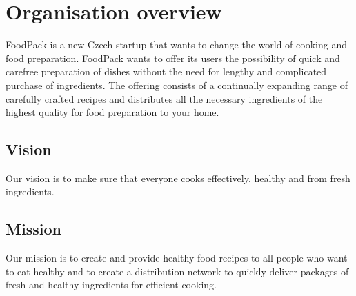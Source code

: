 \documentclass[11pt,a4paper]{article}
\begin{document}
\setlength{\parskip}{0pt}
    \hypersetup{hidelinks}\tableofcontents
\setlength{\parskip}{0pt}

\newpage


\section{Organisation overview}

FoodPack is a new Czech startup that wants to change the world of cooking and food preparation. FoodPack wants to offer its users the possibility of quick and carefree preparation of dishes without the need for lengthy and complicated purchase of ingredients. The offering consists of a continually expanding range of carefully crafted recipes and distributes all the necessary ingredients of the highest quality for food preparation to your home.


\subsection{Vision}

Our vision is to make sure that everyone cooks effectively, healthy and from fresh ingredients.


\subsection{Mission}

Our mission is to create and provide healthy food recipes to all people who want to eat healthy and to create a distribution network to quickly deliver packages of fresh and healthy ingredients for efficient cooking.

\end{document}
